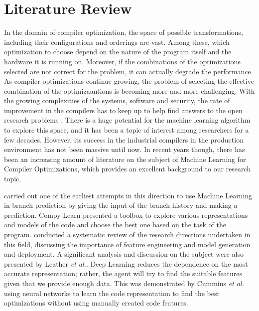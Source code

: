\documentclass[logo,msc]{infthesis}           %
\begin{document}
 

\section{Literature Review}

In the domain of compiler optimization, the space of possible transformations, including their configurations and orderings are vast. Among these, which optimization to choose depend on the nature of the program itself and the hardware it is running on. Moreover, if the combinations of the optimizations selected are not correct for the problem, it can actually degrade the performance.  As compiler optimizations continue growing, the problem of selecting the effective combination of the optimizaantions is becoming more and more challenging.  With the growing complexities of the systems, software and security, the rate of improvement in the compilers has to keep up to help find answers to the open research problems \cite{compilerresearch}. There is a huge potential for the machine learning algorithm to explore this space, and it has been a topic of interest among researchers for a few decades. However, its success in the industrial compilers in the production environment has not been massive until now. In recent years though, there has been an increasing amount of literature on the subject of Machine Learning for Compiler Optimizations, which provides an excellent background to our research topic.

\cite{inproceedingsml} carried out one of the earliest attempts in this direction to use Machine Learning in branch prediction by giving the input of the branch history and making a prediction. Compy-Learn\cite{9232946} presented a toolbox to explore various representations and models of the code and choose the best one based on the task of the program. \cite{8357388} conducted a systematic review of the research directions undertaken in this field, discussing the importance of feature engineering and model generation and deployment. A significant analysis and discussion on the subject were also presented by Leather \textit{et al.}\cite{9232934}. Deep Learning reduces the dependence on the most accurate representation; rather, the agent will try to find the suitable features given that we provide enough data. This was demonstrated by Cummins \textit{et al.}\cite{inproceedingsdl} using neural networks to learn the code representation to find the best optimizations without using manually created code features.
\end{document}
